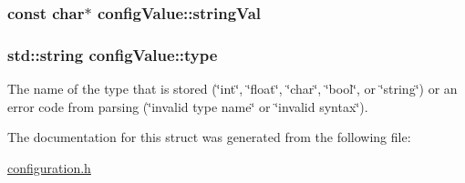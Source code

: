 \hypertarget{structconfigValue_ab7bde03d2ca73f84b5da8fd21b479790}{
\subsubsection[{string\-Val}]{\setlength{\rightskip}{0pt plus 5cm}const char$\ast$ config\-Value\-::string\-Val}}\label{structconfigValue_ab7bde03d2ca73f84b5da8fd21b479790}
\hypertarget{structconfigValue_a2557316e4aad2ae77db15e19422e8aae}{
\subsubsection[{type}]{\setlength{\rightskip}{0pt plus 5cm}std\-::string config\-Value\-::type}}\label{structconfigValue_a2557316e4aad2ae77db15e19422e8aae}
The name of the type that is stored (\char`\"{}int\char`\"{}, \char`\"{}float\char`\"{}, \char`\"{}char\char`\"{}, \char`\"{}bool\char`\"{}, or \char`\"{}string\char`\"{}) or an error code from parsing (\char`\"{}invalid type name\char`\"{} or \char`\"{}invalid
syntax\char`\"{}). 

The documentation for this struct was generated from the following file\-:\begin{DoxyCompactItemize}
\item 
\hyperlink{configuration_8h}{configuration.\-h}\end{DoxyCompactItemize}
